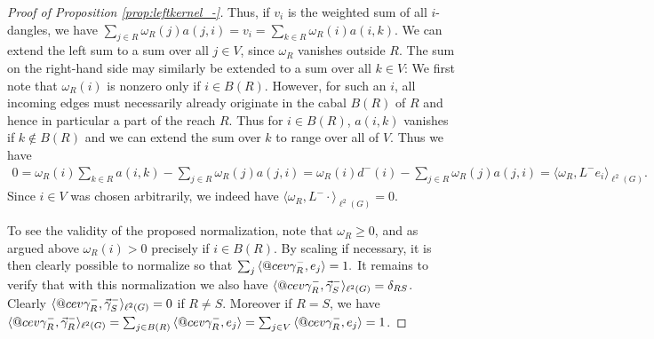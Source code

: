 \documentclass[reqno,12pt,letterpaper]{amsart}
\makeatletter
\numberwithin{equation}{section}
\newcommand{\din}{d^{-}}
\newcommand{\Lin}{L^{-}}
\DeclareRobustCommand{\cev}[1]{%
	\mathpalette\do@cev{#1}%
}
\newcommand{\do@cev}[2]{%
	\fix@cev{#1}{+}%
	\reflectbox{$\m@th#1\vec{\reflectbox{$\fix@cev{#1}{-}\m@th#1#2\fix@cev{#1}{+}$}}$}%
	\fix@cev{#1}{-}%
}
\newcommand{\fix@cev}[2]{%
	\ifx#1\displaystyle
	\mkern#23mu
	\else
	\ifx#1\textstyle
	\mkern#23mu
	\else
	\ifx#1\scriptstyle
	\mkern#22mu
	\else
	\mkern#22mu
	\fi
	\fi
	\fi
}
\newcommand{\1}{\mathds{1}}
\theoremstyle{definition}
\makeatother
\begin{document}
\begin{proof}[Proof of Proposition \ref{prop:leftkernel_-}]
Thus, if $v_i$ is the weighted sum of all $i$-dangles, we have
$
\sum_{j\in R} \omega_R(j)  a(j,i) = v_i = \sum_{k \in R} \omega_R(i) a(i,k) 
$.
We can extend the left sum to a sum over all $j \in V$, since $\omega_R$ vanishes outside $R$. The sum on the right-hand side may similarly be extended to a sum over all $k \in V$: We first note that $\omega_R(i)$ is nonzero only if $i \in B(R)$. However, for such an $i$, all incoming edges must necessarily already originate in the cabal $B(R)$ of $R$ and hence in particular a part of the reach $R$. Thus  for $i \in B(R)$, $a(i,k)$ vanishes if $k \notin B(R)$ and we can extend the sum over $k$ to range over all of $V$.
Thus we have
\begin{align}
0 = \omega_R(i)\sum_{k \in R}   a(i,k)   -   \sum_{j\in R} \omega_R(j)  a(j,i)  = \omega_R(i) \din(i)  -   \sum_{j\in R} \omega_R(j)  a(j,i)  = \langle \omega_R, \Lin e_i \rangle_{\ell^2(G)}.
\end{align}
Since $i\in V$ was chosen arbitrarily, we indeed have $\langle \omega_R, \Lin \cdot\rangle_{\ell^2(G)} = 0$.

\medskip

To see the validity of the proposed normalization, note that $\omega_R \geq 0$, and as argued above $\omega_R(i) > 0$ precisely if $i \in B(R)$. By scaling if necessary, it is then clearly possible to normalize so that  $\sum_{j}\, \langle \cev \gamma^{-}_{R}, e_j \rangle =1.$ It remains to verify that with this normalization we also have $
\langle \cev\gamma^{-}_{R}, \vec\gamma^{-}_{S}\rangle_{\ell^2(G)} = \delta_{RS}$. Clearly $
\langle \cev\gamma^{-}_{R}, \vec\gamma^{-}_{S}\rangle_{\ell^2(G)} = 0 $ if $R \neq S$. Moreover if $R = S$, we have $
\langle \cev\gamma^{-}_{R}, \vec\gamma^{-}_{R}\rangle_{\ell^2(G)}  = \sum_{j \in B(R)}\, \langle \cev \gamma^{-}_{R}, e_j \rangle = \sum_{j \in V}\, \langle \cev \gamma^{-}_{R}, e_j \rangle =1$.
\end{proof}




\medskip
\end{document}
